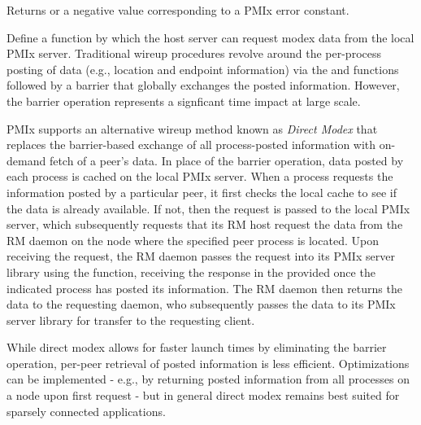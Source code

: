 \begin{arglist}
\end{arglist}

Returns  or a negative value corresponding to a PMIx error constant.

\descr

Define a function by which the host server can request modex data from the local \ac{PMIx} server. Traditional wireup procedures revolve around the per-process posting of data (e.g., location and endpoint information) via the  and  functions followed by a  barrier that globally exchanges the posted information. However, the barrier operation represents a signficant time impact at large scale.

\ac{PMIx} supports an alternative wireup method known as \textit{Direct Modex} that replaces the barrier-based exchange of all process-posted information with on-demand fetch of a peer's data. In place of the barrier operation, data posted by each process is cached on the local \ac{PMIx} server. When a process requests the information posted by a particular peer, it first checks the local cache to see if the data is already available. If not, then the request is passed to the local \ac{PMIx} server, which subsequently requests that its \ac{RM} host request the data from the \ac{RM} daemon on the node where the specified peer process is located. Upon receiving the request, the \ac{RM} daemon passes the request into its \ac{PMIx} server library using the  function, receiving the response in the provided  once the indicated process has posted its information. The \ac{RM} daemon then returns the data to the requesting daemon, who subsequently passes the data to its \ac{PMIx} server library for transfer to the requesting client.

\adviceuserstart
While direct modex allows for faster launch times by eliminating the barrier operation, per-peer retrieval of posted information is less efficient. Optimizations can be implemented - e.g., by returning posted information from all processes on a node upon first request - but in general direct modex remains best suited for sparsely connected applications.
\adviceuserend


